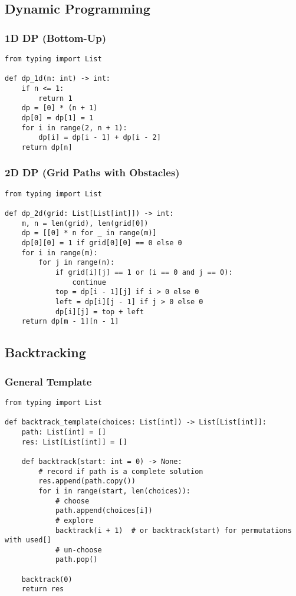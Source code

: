 \documentclass[11pt]{article}
\begin{document}
\subsection{Dynamic Programming}
\subsubsection*{1D DP (Bottom-Up)}
\begin{lstlisting}[style=py,caption={Classic 1D DP (e.g., climb stairs)}]
from typing import List

def dp_1d(n: int) -> int:
    if n <= 1:
        return 1
    dp = [0] * (n + 1)
    dp[0] = dp[1] = 1
    for i in range(2, n + 1):
        dp[i] = dp[i - 1] + dp[i - 2]
    return dp[n]
\end{lstlisting}

\subsubsection*{2D DP (Grid Paths with Obstacles)}
\begin{lstlisting}[style=py,caption={2D DP grid template}]
from typing import List

def dp_2d(grid: List[List[int]]) -> int:
    m, n = len(grid), len(grid[0])
    dp = [[0] * n for _ in range(m)]
    dp[0][0] = 1 if grid[0][0] == 0 else 0
    for i in range(m):
        for j in range(n):
            if grid[i][j] == 1 or (i == 0 and j == 0):
                continue
            top = dp[i - 1][j] if i > 0 else 0
            left = dp[i][j - 1] if j > 0 else 0
            dp[i][j] = top + left
    return dp[m - 1][n - 1]
\end{lstlisting}

\subsection{Backtracking}
\subsubsection*{General Template}
\begin{lstlisting}[style=py,caption={Backtracking skeleton}]
from typing import List

def backtrack_template(choices: List[int]) -> List[List[int]]:
    path: List[int] = []
    res: List[List[int]] = []

    def backtrack(start: int = 0) -> None:
        # record if path is a complete solution
        res.append(path.copy())
        for i in range(start, len(choices)):
            # choose
            path.append(choices[i])
            # explore
            backtrack(i + 1)  # or backtrack(start) for permutations with used[]
            # un-choose
            path.pop()

    backtrack(0)
    return res
\end{lstlisting}
\end{document}
